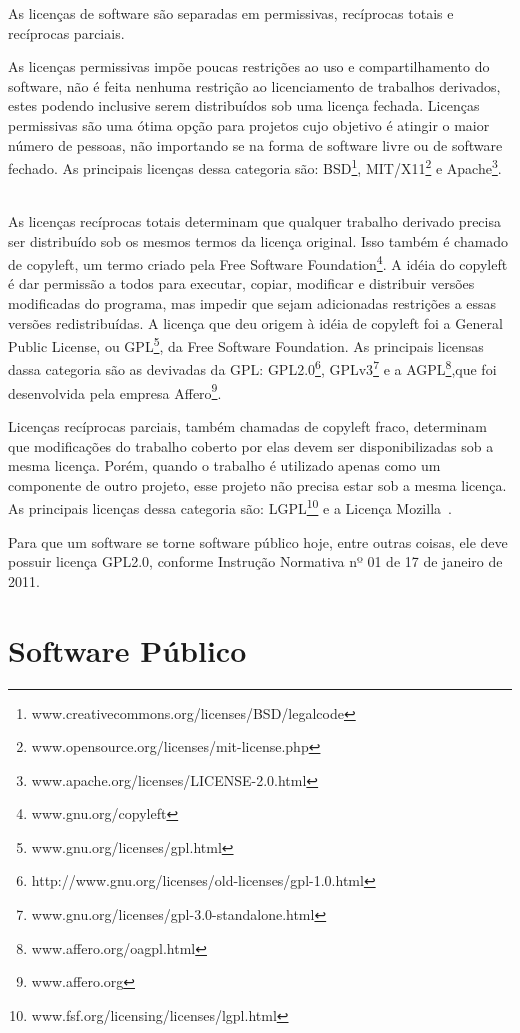 As licenças de software são separadas em permissivas, recíprocas totais e recíprocas
parciais.

As licenças permissivas impõe poucas restrições ao uso e compartilhamento do
software, não é feita nenhuma restrição ao licenciamento de trabalhos derivados, 
estes podendo inclusive serem distribuídos sob uma licença fechada. Licenças permissivas são 
uma ótima opção para projetos cujo objetivo é atingir o maior número de pessoas, 
não importando se na forma de software livre ou de software fechado. As principais 
licenças dessa categoria são: BSD\footnote{www.creativecommons.org/licenses/BSD/legalcode},
MIT/X11\footnote{www.opensource.org/licenses/mit-license.php} e Apache\footnote{www.apache.org/licenses/LICENSE-2.0.html}.
~\cite{sabino2009licenccas}

As licenças recíprocas totais determinam que qualquer trabalho derivado precisa 
ser distribuído sob os mesmos termos da licença original. Isso também é chamado de copyleft,
um termo criado pela Free Software Foundation\footnote{www.gnu.org/copyleft}. A idéia do
copyleft é dar permissão a todos para executar, copiar, modificar e distribuir versões
modificadas do programa, mas impedir que sejam adicionadas restrições a essas versões
redistribuídas. A licença que deu origem à idéia de copyleft foi a General Public 
License, ou GPL\footnote{www.gnu.org/licenses/gpl.html}, da Free Software Foundation.
As principais licensas dassa categoria são as devivadas da GPL: 
GPL2.0\footnote{http://www.gnu.org/licenses/old-licenses/gpl-1.0.html}, 
GPLv3\footnote{www.gnu.org/licenses/gpl-3.0-standalone.html} e a
AGPL\footnote{www.affero.org/oagpl.html},que foi desenvolvida pela empresa 
Affero\footnote{www.affero.org}.~\cite{sabino2009licenccas}

Licenças recíprocas parciais, também chamadas de copyleft fraco, determinam que
modificações do trabalho coberto por elas devem ser disponibilizadas sob a mesma 
licença. Porém, quando o trabalho é utilizado apenas como um componente de outro 
projeto, esse projeto não precisa estar sob a mesma licença. As principais licenças
dessa categoria são: LGPL\footnote{www.fsf.org/licensing/licenses/lgpl.html} e a
Licença Mozilla~\cite{sabino2009licenccas}.

Para que um software se torne software público hoje, entre outras coisas, ele deve
possuir licença GPL2.0, conforme Instrução Normativa nº 01 de 17 de janeiro de 2011.   

\section{Software Público}

